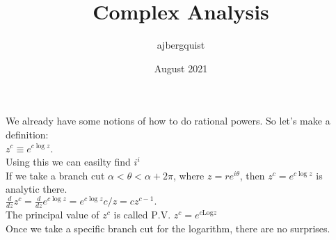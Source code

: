 \documentclass{article}
\title{Complex Analysis}
\author{ajbergquist }
\date{August 2021}
\theoremstyle{definition}
\newcommand{\deriv}{\frac{d}{dz}}
\newcommand{\pv}{\mbox{P.V. }}
\newcommand{\Log}{\mbox{Log}}
\begin{document}
We already have some notions of how to do rational powers. So let's make a definition:\\
$z^c \equiv e^{c\log z}$.\\


Using this we can easilty find $i^i$\\

If we take a branch cut $\alpha < \theta < \alpha + 2\pi$, where $z = re^{i\theta}$, then $z^c = e^{c\log z}$ is analytic there.\\

 $\deriv z^c = \deriv e^{c\log z} = e^{c\log z}c/z = cz^{c-1}.$\\

 The principal value of $z^c$ is called $\pv z^c = e^{c\Log{z}}$\\

 Once we take a specific branch cut for the logarithm, there are no surprises.
\end{document}
